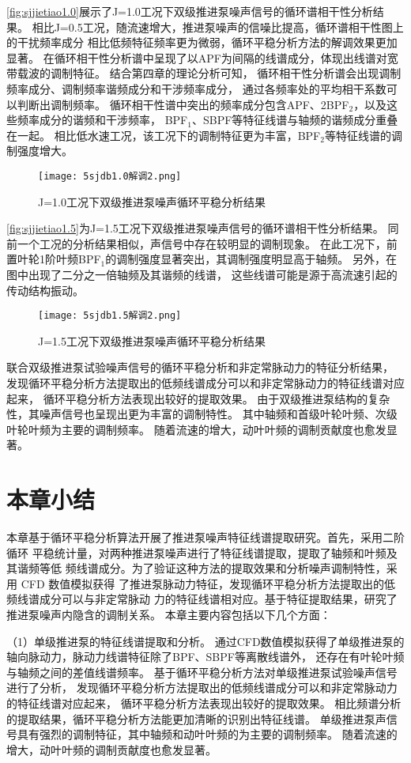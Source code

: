\autoref{fig:sjjietiao1.0}展示了J=1.0工况下双级推进泵噪声信号的循环谱相干性分析结果。
相比J=0.5工况，随流速增大，推进泵噪声的信噪比提高，循环谱相干性图上的干扰频率成分
相比低频特征频率更为微弱，循环平稳分析方法的解调效果更加显著。
在循环相干性分析谱中呈现了以APF为间隔的线谱成分，体现出线谱对宽带载波的调制特征。
结合第四章的理论分析可知，
循环相干性分析谱会出现调制频率成分、调制频率谐频成分和干涉频率成分，
通过各频率处的平均相干系数可以判断出调制频率。
循环相干性谱中突出的频率成分包含APF、2BPF$_2$，以及这些频率成分的谐频和干涉频率，
BPF$_1$、SBPF等特征线谱与轴频的谐频成分重叠在一起。
相比低水速工况，该工况下的调制特征更为丰富，BPF$_2$等特征线谱的调制强度增大。
\begin{figure}[htbp]
    \centering
    \texttt{[image: 5sjdb1.0解调2.png]}
    \caption{\label{fig:sjjietiao1.0}J=1.0工况下双级推进泵噪声循环平稳分析结果}
\end{figure}

\autoref{fig:sjjietiao1.5}为J=1.5工况下双级推进泵噪声信号的循环谱相干性分析结果。
同前一个工况的分析结果相似，声信号中存在较明显的调制现象。
在此工况下，前置叶轮1阶叶频BPF$_1$的调制强度显著突出，其调制强度明显高于轴频。
另外，在图中出现了二分之一倍轴频及其谐频的线谱，
这些线谱可能是源于高流速引起的传动结构振动。
\begin{figure}[htbp]
    \centering
    \texttt{[image: 5sjdb1.5解调2.png]}
    \caption{\label{fig:sjjietiao1.5}J=1.5工况下双级推进泵噪声循环平稳分析结果}
\end{figure}

联合双级推进泵试验噪声信号的循环平稳分析和非定常脉动力的特征分析结果，
发现循环平稳分析方法提取出的低频线谱成分可以和非定常脉动力的特征线谱对应起来，
循环平稳分析方法表现出较好的提取效果。
由于双级推进泵结构的复杂性，其噪声信号也呈现出更为丰富的调制特性。
其中轴频和首级叶轮叶频、次级叶轮叶频为主要的调制频率。
随着流速的增大，动叶叶频的调制贡献度也愈发显著。
\section{本章小结}
本章基于循环平稳分析算法开展了推进泵噪声特征线谱提取研究。首先，采用二阶循环
平稳统计量，对两种推进泵噪声进行了特征线谱提取，提取了轴频和叶频及其谐频等低
频线谱成分。为了验证这种方法的提取效果和分析噪声调制特性，采用 CFD 数值模拟获得
了推进泵脉动力特征，发现循环平稳分析方法提取出的低频线谱成分可以与非定常脉动
力的特征线谱相对应。基于特征提取结果，研究了推进泵噪声内隐含的调制关系。
本章主要内容包括以下几个方面：

（1）单级推进泵的特征线谱提取和分析。
通过CFD数值模拟获得了单级推进泵的轴向脉动力，脉动力线谱特征除了BPF、SBPF等离散线谱外，
还存在有叶轮叶频与轴频之间的差值线谱频率。
基于循环平稳分析方法对单级推进泵试验噪声信号进行了分析，
发现循环平稳分析方法提取出的低频线谱成分可以和非定常脉动力的特征线谱对应起来，
循环平稳分析方法表现出较好的提取效果。
相比频谱分析的提取结果，循环平稳分析方法能更加清晰的识别出特征线谱。
单级推进泵声信号具有强烈的调制特征，其中轴频和动叶叶频的为主要的调制频率。
随着流速的增大，动叶叶频的调制贡献度也愈发显著。

